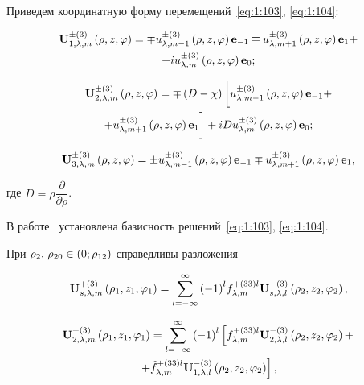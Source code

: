\begin{russian}
Приведем координатную форму перемещений~\eqref{eq:1:103}, \eqref{eq:1:104}:

\begin{multline}\label{eq:1:106}
{\bf{U}}_{1,\lambda ,m}^{ \pm (3)}\left( {\rho ,z,\varphi } \right) =  \mp u_{\lambda ,m - 1}^{ \pm (3)}\left( {\rho ,z,\varphi } \right){{\bf{e}}_{ - 1}} \mp u_{\lambda ,m + 1}^{ \pm (3)}\left( {\rho ,z,\varphi } \right){{\bf{e}}_1} + \\
+ iu_{\lambda ,m}^{ \pm (3)}\left( {\rho ,z,\varphi } \right){{\bf{e}}_0};
\end{multline}

\begin{multline}\label{eq:1:107}
{\bf{U}}_{2,\lambda ,m}^{ \pm (3)}\left( {\rho ,z,\varphi } \right) =  \mp \left( {D - \chi } \right)\bigg[u_{\lambda ,m - 1}^{ \pm (3)}\left( {\rho ,z,\varphi } \right){{\bf{e}}_{ - 1}} + \\
+ u_{\lambda ,m + 1}^{ \pm (3)}\left( {\rho ,z,\varphi } \right){{\bf{e}}_1} \bigg] + iDu_{\lambda ,m}^{ \pm (3)}\left( {\rho ,z,\varphi } \right){{\bf{e}}_0};
\end{multline}

\begin{equation}\label{eq:1:108}
{\bf{U}}_{3,\lambda ,m}^{ \pm (3)}\left( {\rho ,z,\varphi } \right) =  \pm u_{\lambda ,m - 1}^{ \pm (3)}\left( {\rho ,z,\varphi } \right){{\bf{e}}_{ - 1}} \mp u_{\lambda ,m + 1}^{ \pm (3)}\left( {\rho ,z,\varphi } \right){{\bf{e}}_1},
\end{equation}

\noindent где $D = \rho \dfrac{\partial }{{\partial \rho }}$.

В работе~\cite{Nikolaev1998} установлена базисность решений~\eqref{eq:1:103}, \eqref{eq:1:104}.

\begin{theorem}
При ${\rho _2},{\mkern 1mu} {\kern 1pt} {\rho _{20}} \in \left( {0;{\rho _{12}}} \right)$ справедливы разложения

\begin{equation}\label{eq:1:109}
{\bf{U}}_{s,\lambda ,m}^{ + (3)}\left( {{\rho _1},{z_1},{\varphi _1}} \right) = \sum\limits_{l =  - \infty }^\infty  {{{( - 1)}^l}} f_{\lambda ,m}^{ + (33)l}{\bf{U}}_{s,\lambda ,l}^{ - (3)}\left( {{\rho _2},{z_2},{\varphi _2}} \right),
\end{equation}

\begin{multline}\label{eq:1:110}
{\bf{U}}_{2,\lambda ,m}^{ + (3)}\left( {{\rho _1},{z_1},{\varphi _1}} \right) = \sum\limits_{l =  - \infty }^\infty  {{{( - 1)}^l}} \left[ {f_{\lambda ,m}^{ + (33)l}{\bf{U}}_{2,\lambda ,l}^{ - (3)}\left( {{\rho _2},{z_2},{\varphi _2}} \right) + } \right.\\
\left. { + \tilde f_{\lambda ,m}^{ + (33)l}{\bf{U}}_{1,\lambda ,l}^{ - (3)}\left( {{\rho _2},{z_2},{\varphi _2}} \right)} \right],
\end{multline}


\end{theorem}
\end{russian}
